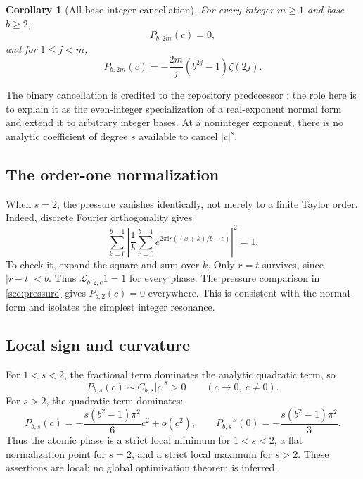 \documentclass[11pt,a4paper]{article}
\numberwithin{equation}{section}
\newtheorem{corollary}[corollary]{Corollary}
\theoremstyle{definition}
\theoremstyle{remark}
\newcommand{\ii}{\mathrm i}
\newcommand{\Lop}{\mathcal L}
\begin{document}
\begin{corollary}[All-base integer cancellation]
\label{cor:cancel}
For every integer $m\ge1$ and base $b\ge2$,
\begin{equation}
 [c^{2m}]P_{b,2m}(c)=0,
 \label{eq:cancel}
\end{equation}
and for $1\le j<m$,
\begin{equation}
 [c^{2j}]P_{b,2m}(c)
 =-\frac{2m}{j}(b^{2j}-1)\zeta(2j).
 \label{eq:lowercoeff}
\end{equation}
\end{corollary}

The binary cancellation is credited to the repository predecessor
\cite{IntegerRepo}; the role here is to explain it as the even-integer
specialization of a real-exponent normal form and extend it to arbitrary
integer bases. At a noninteger exponent, there is no analytic coefficient
of degree $s$ available to cancel $|c|^s$.

\subsection{The order-one normalization}
When $s=2$, the pressure vanishes identically, not merely to a finite
Taylor order. Indeed, discrete Fourier orthogonality gives
\begin{equation}
 \sum_{k=0}^{b-1}\left|
 \frac1b\sum_{r=0}^{b-1}e^{2\pi\ii r((x+k)/b-c)}\right|^2=1.
 \label{eq:g-normalization}
\end{equation}
To check it, expand the square and sum over $k$. Only $r=t$ survives,
since $|r-t|<b$. Thus $\Lop_{b,2,c}1=1$ for every phase. The pressure
comparison in \cref{sec:pressure} gives $P_{b,2}(c)=0$ everywhere.
This is consistent with the normal form and isolates the simplest
integer resonance.

\subsection{Local sign and curvature}
For $1<s<2$, the fractional term dominates the analytic quadratic term,
so
\begin{equation}
 P_{b,s}(c)\sim C_{b,s}|c|^s>0\qquad(c\to0,\ c\ne0).
 \label{eq:sub-two}
\end{equation}
For $s>2$, the quadratic term dominates:
\begin{equation}
 P_{b,s}(c)
 =-\frac{s(b^2-1)\pi^2}{6}c^2+o(c^2),\qquad
 P_{b,s}''(0)=-\frac{s(b^2-1)\pi^2}{3}.
 \label{eq:curvature}
\end{equation}
Thus the atomic phase is a strict local minimum for $1<s<2$, a flat
normalization point for $s=2$, and a strict local maximum for $s>2$.
These assertions are local; no global optimization theorem is inferred.
\end{document}
